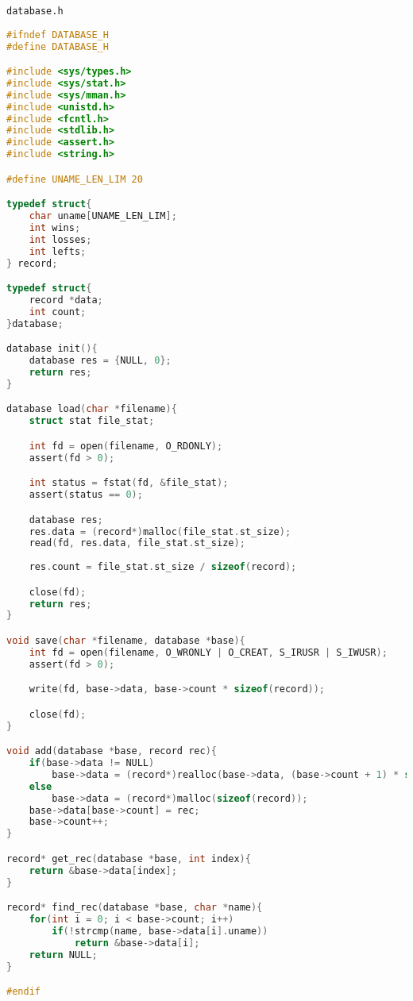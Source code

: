 \documentclass[12pt]{article}
\begin{document}
\verb|database.h|
\begin{lstlisting}[language=C, basicstyle=\scriptsize]
#ifndef DATABASE_H
#define DATABASE_H

#include <sys/types.h>
#include <sys/stat.h>
#include <sys/mman.h>
#include <unistd.h>
#include <fcntl.h>
#include <stdlib.h>
#include <assert.h>
#include <string.h>

#define UNAME_LEN_LIM 20

typedef struct{
    char uname[UNAME_LEN_LIM];
    int wins;
    int losses;
    int lefts;
} record;

typedef struct{
    record *data;
    int count;
}database;

database init(){
    database res = {NULL, 0};
    return res;
}

database load(char *filename){
    struct stat file_stat;

    int fd = open(filename, O_RDONLY);
    assert(fd > 0);

    int status = fstat(fd, &file_stat);
    assert(status == 0);

    database res;
    res.data = (record*)malloc(file_stat.st_size);
    read(fd, res.data, file_stat.st_size);
    
    res.count = file_stat.st_size / sizeof(record);

    close(fd);
    return res;
}

void save(char *filename, database *base){
    int fd = open(filename, O_WRONLY | O_CREAT, S_IRUSR | S_IWUSR);
    assert(fd > 0);

    write(fd, base->data, base->count * sizeof(record));

    close(fd);
}

void add(database *base, record rec){
    if(base->data != NULL)
        base->data = (record*)realloc(base->data, (base->count + 1) * sizeof(record));
    else
        base->data = (record*)malloc(sizeof(record));
    base->data[base->count] = rec;
    base->count++;
}

record* get_rec(database *base, int index){
    return &base->data[index];
}

record* find_rec(database *base, char *name){
    for(int i = 0; i < base->count; i++)
        if(!strcmp(name, base->data[i].uname))
            return &base->data[i];
    return NULL;
}

#endif
\end{lstlisting}
\end{document}
